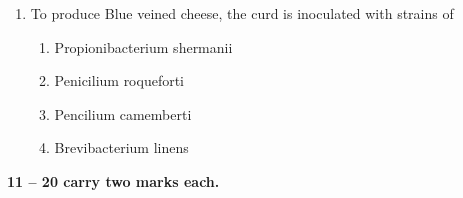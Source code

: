 \documentclass[journal,12pt,onecolumn]{IEEEtran}
\begin{document}
\begin{enumerate}[label=\arabic*.]
\item To produce Blue veined cheese, the curd is inoculated with strains of

\begin{multicols}{2}
\begin{enumerate}[label=(\Alph*)]
\item Propionibacterium shermanii
\item Penicilium roqueforti
\item Pencilium camemberti
\item Brevibacterium linens
\end{enumerate}
\end{multicols}

\end{enumerate}

\vspace{0.5cm}
\noindent \textbf{ 11 -- 20 carry two marks each.}
\end{document}
